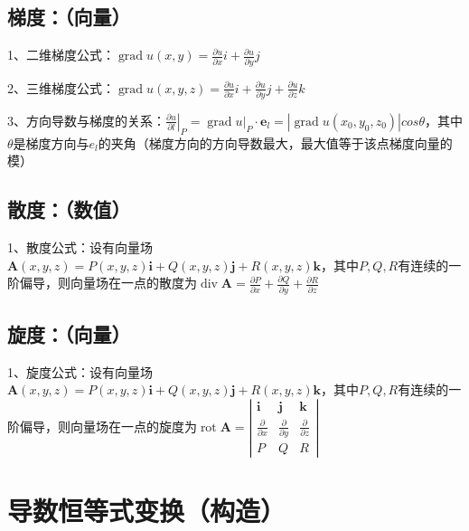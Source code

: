 \subsection{梯度：（向量）}

1、二维梯度公式：$\operatorname{grad} u(x, y)=\frac{\partial u}{\partial x} i+\frac{\partial u}{\partial y} j$

2、三维梯度公式：$\operatorname{grad} u(x, y, z)=\frac{\partial u}{\partial x} i+\frac{\partial u}{\partial y} j+\frac{\partial u}{\partial z} k$

3、方向导数与梯度的关系：$\left.\frac{\partial u}{\partial{l}}\right|_{P}=\left.\operatorname{grad} u\right|_{P} \cdot \boldsymbol{e}_{l}=|\operatorname{grad} u(x_0, y_0, z_0) |cos \theta$，其中$\theta$是梯度方向与$e_l$的夹角（梯度方向的方向导数最大，最大值等于该点梯度向量的模）



\subsection{散度：（数值）}

1、散度公式：设有向量场$\boldsymbol{A}(x, y, z)=P(x, y, z) \boldsymbol{i}+Q(x, y, z) \boldsymbol{j}+R(x, y, z) \boldsymbol{k}$，其中$P,Q,R$有连续的一阶偏导，则向量场在一点的散度为$\operatorname{div} \boldsymbol{A}=\frac{\partial P}{\partial x}+\frac{\partial Q}{\partial y}+\frac{\partial R}{\partial z}$



\subsection{旋度：（向量）}

1、旋度公式：设有向量场$\boldsymbol{A}(x, y, z)=P(x, y, z) \boldsymbol{i}+Q(x, y, z) \boldsymbol{j}+R(x, y, z) \boldsymbol{k}$，其中$P,Q,R$有连续的一阶偏导，则向量场在一点的旋度为$\operatorname{rot} \boldsymbol{A}=\left|\begin{array}{ccc}\boldsymbol{i} & \boldsymbol{j} & \boldsymbol{k} \\\frac{\partial}{\partial x} & \frac{\partial}{\partial y} & \frac{\partial}{\partial z} \\P & Q & R\end{array}\right|$

\section{导数恒等式变换（构造）}

